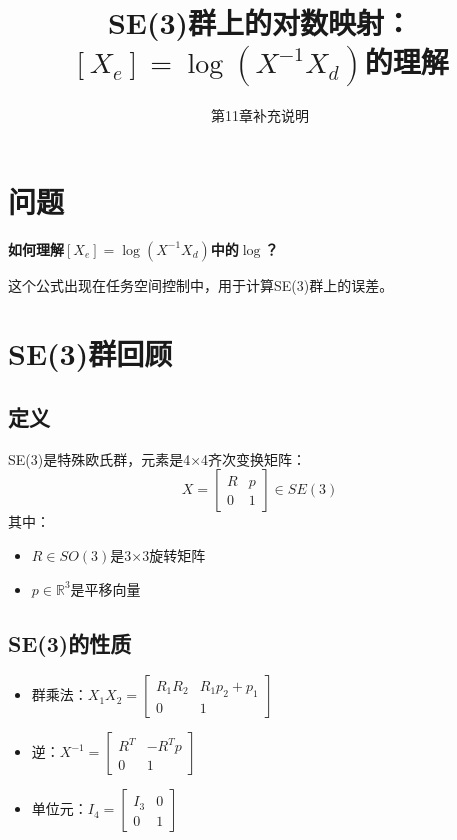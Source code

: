 \documentclass[12pt,a4paper]{article}
\title{SE(3)群上的对数映射：$[X_e] = \log(X^{-1} X_d)$的理解}
\author{第11章补充说明}
\date{}
\begin{document}
\maketitle

\section{问题}

\textbf{如何理解$[X_e] = \log(X^{-1} X_d)$中的$\log$？}

这个公式出现在任务空间控制中，用于计算SE(3)群上的误差。

\section{SE(3)群回顾}

\subsection{定义}

SE(3)是特殊欧氏群，元素是4×4齐次变换矩阵：
\begin{equation}
X = \begin{bmatrix}
R & p \\
0 & 1
\end{bmatrix} \in SE(3)
\end{equation}
其中：
\begin{itemize}
\item $R \in SO(3)$是3×3旋转矩阵
\item $p \in \mathbb{R}^3$是平移向量
\end{itemize}

\subsection{SE(3)的性质}

\begin{itemize}
\item 群乘法：$X_1 X_2 = \begin{bmatrix} R_1 R_2 & R_1 p_2 + p_1 \\ 0 & 1 \end{bmatrix}$
\item 逆：$X^{-1} = \begin{bmatrix} R^T & -R^T p \\ 0 & 1 \end{bmatrix}$
\item 单位元：$I_4 = \begin{bmatrix} I_3 & 0 \\ 0 & 1 \end{bmatrix}$
\end{itemize}
\end{document}
